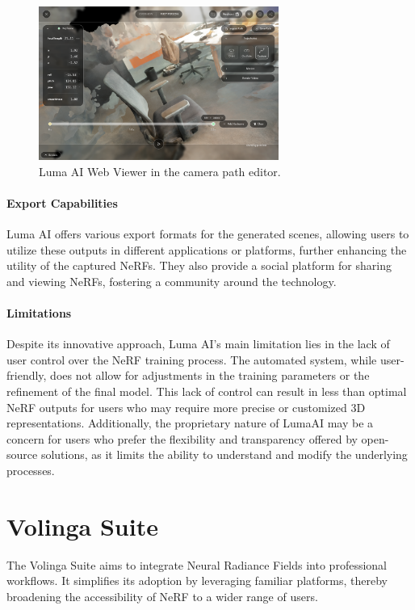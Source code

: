 \begin{figure}[h!]
  \centering
  \includegraphics[width=0.7\textwidth]{figures/related-luma.png}
  \caption{Luma AI Web Viewer in the camera path editor.}
  \label{fig:luma-viewer}
\end{figure}

\paragraph{Export Capabilities}
Luma AI offers various export formats for the generated scenes, allowing users to utilize these outputs in different applications or platforms, further enhancing the utility of the captured NeRFs.
They also provide a social platform for sharing and viewing NeRFs, fostering a community around the technology.

\paragraph{Limitations}
Despite its innovative approach, Luma AI's main limitation lies in the lack of user control over the NeRF training process.
The automated system, while user-friendly, does not allow for adjustments in the training parameters or the refinement of the final model.
This lack of control can result in less than optimal NeRF outputs for users who may require more precise or customized 3D representations.
Additionally, the proprietary nature of LumaAI may be a concern for users who prefer the flexibility and transparency offered by open-source solutions, as it limits the ability to understand and modify the underlying processes.

\section{Volinga Suite}

The Volinga Suite \cite{noauthor_volinga_nodate} aims to integrate Neural Radiance Fields into professional workflows.
It simplifies its adoption by leveraging familiar platforms, thereby broadening the accessibility of NeRF to a wider range of users.

